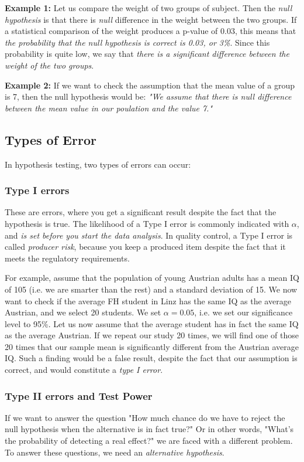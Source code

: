 \textbf{Example 1: } Let us compare the weight of two groups of subject. Then the \emph{null hypothesis} is that there is \emph{null} difference in the weight between the two groups. If a statistical comparison of the weight produces a p-value of 0.03, this means that \emph{the probability that the null hypothesis is correct is 0.03, or 3\%}. Since this probability is quite low, we say that \emph{there is a significant difference between the weight of the two groups}.

\textbf{Example 2: } If we want to check the assumption that the mean value of a group is 7, then the null hypothesis would be: \emph{"We assume that there is null difference between the mean value in our poulation and the value 7."}

\subsection{Types of Error}
In hypothesis testing, two types of errors can occur:

\subsubsection{Type I errors}  
These are errors, where you get a significant result despite the fact that the hypothesis is true. The likelihood of a Type I error is commonly indicated with $\alpha$, and \emph{is set before you start the data analysis}. In quality control, a Type I error is called \emph{producer risk}, because you keep a produced item despite the fact that it meets the regulatory requirements.

For example, assume that the population of young Austrian adults has a mean IQ of 105 (i.e. we are smarter than the rest) and a standard deviation of 15. We now want to check if the average FH student in Linz has the same IQ as the average Austrian, and we select 20 students. We set $\alpha=0.05$, i.e. we set our significance level to 95\%.
Let us now assume that the average student has in fact the same IQ as the average Austrian. If we repeat our study 20 times, we will find one of those 20 times that our sample mean is significantly different from the Austrian average IQ. Such a finding would be a false result, despite the fact that our assumption is correct, and would constitute a \emph{type I error}.

\subsubsection{Type II errors and Test Power}
If we want to answer the question "How much chance do we have to reject the null hypothesis when the alternative is in fact true?" Or in other words, "What’s the probability of detecting a real effect?" we are faced with a different problem. To answer these questions, we need an \emph{alternative hypothesis}.

